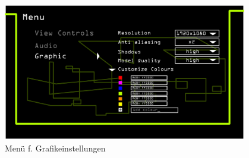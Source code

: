 	\begin{figure}[ht]
	  \centering
	  \includegraphics[width = 0.95\textwidth]{Systemmodelle/08_Knot3-menu-graphics.png}
	  \caption{Menü f. Grafikeinstellungen}
	\end{figure}

	
\clearpage
	
